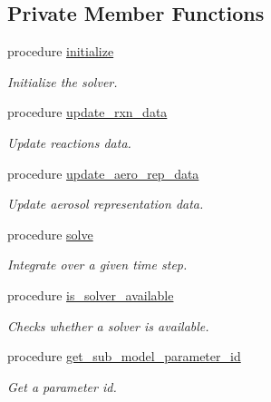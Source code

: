 \subsection*{Private Member Functions}
\begin{DoxyCompactItemize}
\item 
procedure \mbox{\hyperlink{structpmc__phlex__solver__data_1_1phlex__solver__data__t_aa8970495261c26e8d46d68f247d9c3ed}{initialize}}
\begin{DoxyCompactList}\small\item\em Initialize the solver. \end{DoxyCompactList}\item 
procedure \mbox{\hyperlink{structpmc__phlex__solver__data_1_1phlex__solver__data__t_a8615f50fc8dd9f4b9ec4f8bc58a9a946}{update\+\_\+rxn\+\_\+data}}
\begin{DoxyCompactList}\small\item\em Update reactions data. \end{DoxyCompactList}\item 
procedure \mbox{\hyperlink{structpmc__phlex__solver__data_1_1phlex__solver__data__t_a820bbbb80d42a3036ab9e3ba5df7503c}{update\+\_\+aero\+\_\+rep\+\_\+data}}
\begin{DoxyCompactList}\small\item\em Update aerosol representation data. \end{DoxyCompactList}\item 
procedure \mbox{\hyperlink{structpmc__phlex__solver__data_1_1phlex__solver__data__t_a648dfd8fd8ef6a536516ae7b1a8b0ee1}{solve}}
\begin{DoxyCompactList}\small\item\em Integrate over a given time step. \end{DoxyCompactList}\item 
procedure \mbox{\hyperlink{structpmc__phlex__solver__data_1_1phlex__solver__data__t_a56c0f7e8807d76e4587e0846c1f1df2f}{is\+\_\+solver\+\_\+available}}
\begin{DoxyCompactList}\small\item\em Checks whether a solver is available. \end{DoxyCompactList}\item 
procedure \mbox{\hyperlink{structpmc__phlex__solver__data_1_1phlex__solver__data__t_a15e24fea5292ee83ea606015a277cf2e}{get\+\_\+sub\+\_\+model\+\_\+parameter\+\_\+id}}
\begin{DoxyCompactList}\small\item\em Get a parameter id. \end{DoxyCompactList}\item 

\end{DoxyCompactItemize}
